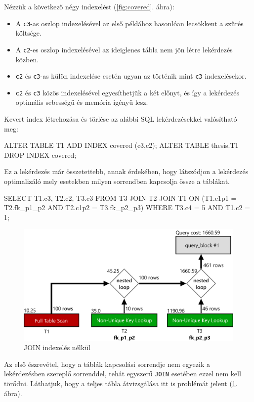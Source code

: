 Nézzük a következő négy indexelést (\ref{fig:covered}. ábra):
\begin{itemize} 
\item A \texttt{c3}-as oszlop indexelésével az első példához hasonlóan lecsökkent a szűrés költsége.
\item A \texttt{c2}-es oszlop indexelésével az ideiglenes tábla nem jön létre lekérdezés közben.
\item \texttt{c2} és \texttt{c3}-as külön indexelése esetén ugyan az történik mint \texttt{c3} indexelésekor.
\item \texttt{c2} és \texttt{c3} közös indexelésével egyesíthetjük a két előnyt, és így a lekérdezés optimális sebességű és memória igényű lesz.
\end{itemize} 
Kevert index létrehozása és törlése az alábbi SQL lekérdezésekkel valósítható meg:
\begin{python}
ALTER TABLE T1 ADD INDEX covered (c3,c2);
ALTER TABLE thesis.T1 DROP INDEX covered;
\end{python}


Ez a lekérdezés már összetettebb, annak érdekében, hogy látszódjon a lekérdezés optimalizáló mely esetekben milyen sorrendben kapcsolja össze a táblákat.
\begin{python}
SELECT T1.c3, T2.c2, T3.c3
FROM T3 JOIN T2 JOIN T1 
    ON (T1.c1p1 = T2.fk_p1_p2 AND T2.c1p2 = T3.fk_p2_p3) 
WHERE T3.c4 = 5 AND T1.c2 = 1;
\end{python}

\begin{figure}[h!]
\centering
\includegraphics[width=14cm]{images/explain/3-1.png}
\caption{JOIN indexelés nélkül}
\label{fig:explain_3_1}
\end{figure}

Az első észrevétel, hogy a táblák kapcsolási sorrendje nem egyezik a lekérdezésben szereplő sorrenddel, tehát egyszerű \texttt{JOIN} esetében ezzel nem kell törődni. Láthatjuk, hogy a teljes tábla átvizsgálása itt is problémát jelent (\ref{fig:explain_3_1}. ábra). 

